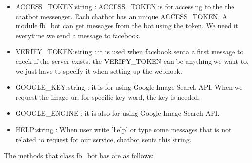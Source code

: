 \begin{itemize}
\item ACCESS\_TOKEN:string : ACCESS\_TOKEN is for accessing to the the chatbot messenger. Each chatbot has an unique ACCESS\_TOKEN. A module fb\_bot can get messages from the bot using the token. We need it everytime we send a message to facebook. \newline
\item VERIFY\_TOKEN:string : it is used when facebook senta a first message to check if the server exists. the VERIFY\_TOKEN can be anything we want to, we just have to specify it when setting up the webhook. \newline
\item GOOGLE\_KEY:string : it is for using Google Image Search API. When we request the image url for specific key word, the key is needed. \newline
\item GOOGLE\_ENGINE : it is also for using Google Image Search API. \newline
\item HELP:string : When user write 'help' or type some messages that is not related to request for our service, chatbot sents this string.\newline

\end{itemize} 

The methods that class fb\_bot has are as follows: \newline


